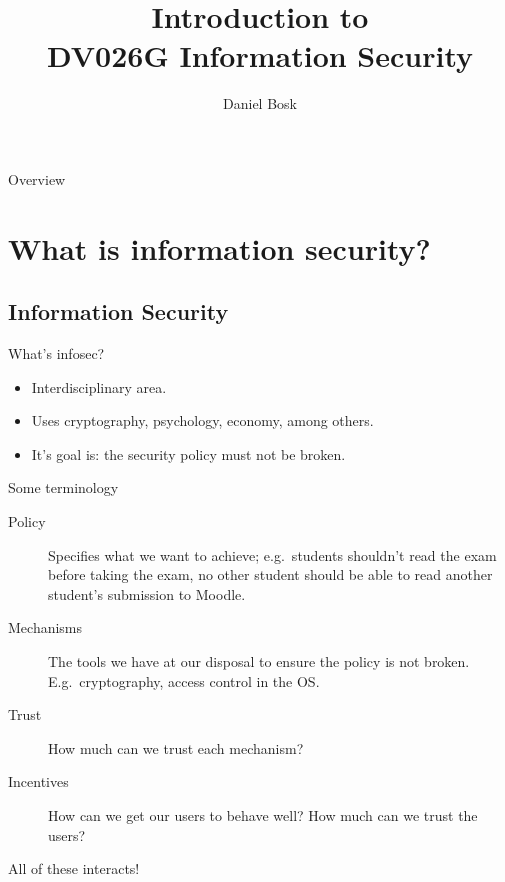 \documentclass{beamer}
\title[Intro infosakb]{%
  Introduction to\\
  DV026G Information Security
}
\author{Daniel Bosk}
\institute[MIUN IKS]{%
  Department of Information and Communication Systems (ICS),\\
  Mid Sweden University, Sundsvall.
}
\date{\svnId}
\begin{document}
\begin{frame}
  \titlepage
\end{frame}

\begin{frame}{Overview}
  \tableofcontents
\end{frame}





\section[What's infosec?]{What is information security?}

\subsection{Information Security}

\begin{frame}{What's infosec?}
  \begin{itemize}
    \item Interdisciplinary area.
    \item Uses cryptography, psychology, economy, among others.
    \item It's goal is: the security policy must not be broken.
  \end{itemize}
\end{frame}

\begin{frame}{Some terminology}
  \begin{description}
    \item[Policy] Specifies what we want to achieve; e.g.~students shouldn't 
      read the exam before taking the exam, no other student should be able to 
      read another student's submission to Moodle.

    \item[Mechanisms] The tools we have at our disposal to ensure the policy is 
      not broken.
      E.g.~cryptography, access control in the OS.

    \item[Trust] How much can we trust each mechanism?

    \item[Incentives] How can we get our users to behave well?
      How much can we trust the users?

  \end{description}

  \begin{center}
    All of these interacts!
  \end{center}
\end{frame}
\end{document}
